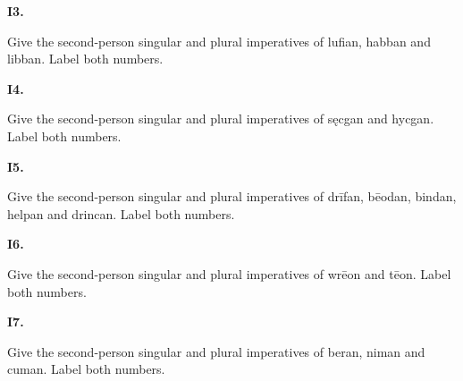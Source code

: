\par\begin{minipage}{\linewidth}\raggedright
\textbf{I3.}

Give the second-person singular and plural imperatives of lufian, habban and libban. Label both numbers.

\end{minipage}\par\addvspace{4pt}

\par\begin{minipage}{\linewidth}\raggedright
\textbf{I4.}

Give the second-person singular and plural imperatives of sęcgan and hycgan. Label both numbers.

\end{minipage}\par\addvspace{4pt}

\par\begin{minipage}{\linewidth}\raggedright
\textbf{I5.}

Give the second-person singular and plural imperatives of drīfan, bēodan, bindan, helpan and drincan. Label both numbers.

\end{minipage}\par\addvspace{4pt}

\par\begin{minipage}{\linewidth}\raggedright
\textbf{I6.}

Give the second-person singular and plural imperatives of wrēon and tēon. Label both numbers.

\end{minipage}\par\addvspace{4pt}

\par\begin{minipage}{\linewidth}\raggedright
\textbf{I7.}

Give the second-person singular and plural imperatives of beran, niman and cuman. Label both numbers.

\end{minipage}\par\addvspace{4pt}

